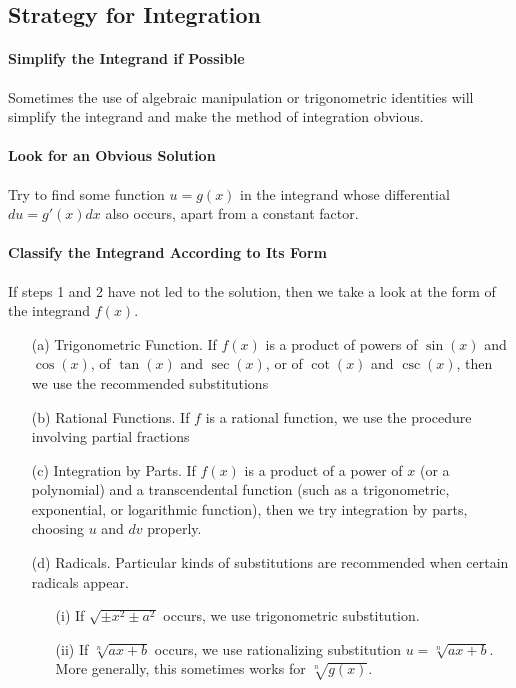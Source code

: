 \documentclass[10pt]{report}
\begin{document}
\subsection{Strategy for Integration}
\paragraph{Simplify the Integrand if Possible}
Sometimes the use of algebraic manipulation or trigonometric identities will simplify the integrand and make the method of integration obvious.
\paragraph{Look for an Obvious Solution}
Try to find some function $u=g(x)$ in the integrand whose differential $du=g'(x)dx$ also occurs, apart from a constant factor.
\paragraph{Classify the Integrand According to Its Form}
If steps 1 and 2 have not led to the solution, then we take a look at the form of the integrand $f(x)$.
\begin{itemize}
\item[(a)]Trigonometric Function. If $f(x)$ is a product of powers of $\sin(x)$ and $\cos(x)$, of $\tan(x)$ and $\sec(x)$, or of $\cot(x)$ and $\csc(x)$, then we use the recommended substitutions
\item[(b)]Rational Functions. If $f$ is a rational function, we use the procedure involving partial fractions
\item[(c)]Integration by Parts. If $f(x)$ is a product of a power of $x$ (or a polynomial) and a transcendental function (such as a trigonometric, exponential, or logarithmic function), then we try integration by parts, choosing $u$ and $dv$ properly.
\item[(d)]Radicals. Particular kinds of substitutions are recommended when certain radicals appear.
\begin{itemize}
\item[(i)] If $\sqrt{\pm x^2\pm a^2}$ occurs, we use trigonometric substitution.
\item[(ii)] If $\sqrt[n]{ax+b}$ occurs, we use rationalizing substitution $u=\sqrt[n]{ax+b}$. More generally, this sometimes works for $\sqrt[n]{g(x)}$.
\end{itemize}
\end{itemize}
\end{document}
